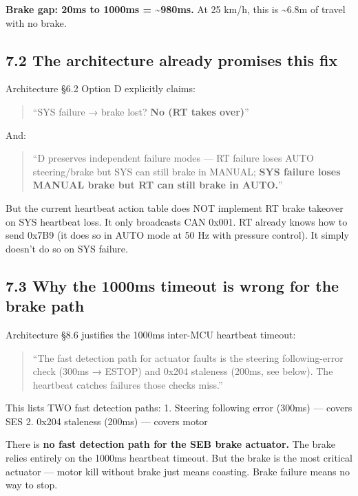 \documentclass[12pt,a4paper,oneside]{report}
\begin{document}
\textbf{Brake gap: 20ms to 1000ms = \textasciitilde980ms.} At 25 km/h, this is
\textasciitilde6.8m of travel with no brake.

\subsection{7.2 The architecture already promises this
fix}\label{the-architecture-already-promises-this-fix}

Architecture §6.2 Option D explicitly claims:

\begin{quote}
``SYS failure → brake lost? \textbf{No (RT takes over)}''
\end{quote}

And:

\begin{quote}
``D preserves independent failure modes --- RT failure loses AUTO steering/brake
but SYS can still brake in MANUAL; \textbf{SYS failure loses MANUAL brake but RT
can still brake in AUTO.}''
\end{quote}

But the current heartbeat action table does NOT implement RT brake takeover on
SYS heartbeat loss. It only broadcasts CAN 0x001. RT already knows how to send
0x7B9 (it does so in AUTO mode at 50 Hz with pressure control). It simply
doesn't do so on SYS failure.

\subsection{7.3 Why the 1000ms timeout is wrong for the brake
path}\label{why-the-1000ms-timeout-is-wrong-for-the-brake-path}

Architecture §8.6 justifies the 1000ms inter-MCU heartbeat timeout:

\begin{quote}
``The fast detection path for actuator faults is the steering following-error
check (300ms → ESTOP) and 0x204 staleness (200ms, see below). The heartbeat
catches failures those checks miss.''
\end{quote}

This lists TWO fast detection paths: 1. Steering following error (300ms) ---
covers SES 2. 0x204 staleness (200ms) --- covers motor

There is \textbf{no fast detection path for the SEB brake actuator.} The brake
relies entirely on the 1000ms heartbeat timeout. But the brake is the most
critical actuator --- motor kill without brake just means coasting. Brake
failure means no way to stop.
\end{document}
